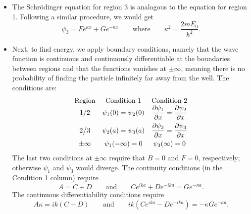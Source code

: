 \documentclass[11pt, a4paper]{article}
\newcommand{\eqtext}[1]{\qquad \text{#1} \qquad}
\newcommand{\Schro}{Schr\"{o}dinger\xspace}
\begin{document}
\begin{itemize}
	\item The \Schro equation for region 3 is analogous to the equation for region 1. Following a similar procedure, we would get
	\begin{equation*}
		\psi_{3} = Fe^{\kappa x} + Ge^{-\kappa x} \eqtext{where} \kappa^{2} = \frac{2mE_{0}}{\hbar^{2}}.
	\end{equation*}
	
	\item Next, to find energy, we apply boundary conditions, namely that the wave function is continuous and continuously differentiable at the boundaries between regions and that the functions vanishes at $ \pm \infty $, meaning there is no probability of finding the particle infinitely far away from the well. The conditions are:
	\[
		\begin{array}{ccc}
			\text{Region} & \text{Condition 1} & \text{Condition 2}\\
			1/2 & \psi_{1}(0) = \psi_{2}(0) &\displaystyle \pdv{\psi_{1}}{x} (0) = \pdv{\psi_{2}}{x} (0)\\[3mm]
			2\big/3 & \psi_{2}(a) = \psi_{3} (a) &\displaystyle \pdv{\psi_{2}}{x} (a) = \pdv{\psi_{3}}{x} (a)\\[2.5mm]
			\pm \infty & \psi_{1}(-\infty) = 0 & \psi_{3}(\infty) = 0
		\end{array}
	\]
	The last two conditions at $ \pm \infty $ require that $ B = 0 $ and $ F = 0 $, respectively; otherwise $ \psi_{1} $ and $ \psi_{3} $ would diverge. The continuity conditions (in the Condition 1 column) require
	\begin{equation*}
		A = C + D \eqtext{and} Ce^{ika} + De^{-ika} = Ge^{-\kappa a}.
	\end{equation*}
	The continuous differentiability conditions require 
	\begin{equation*}
		A\kappa = ik(C-D) \eqtext{and} ik(Ce^{ika} - De^{-ika}) = - \kappa Ge^{-\kappa a}.
	\end{equation*}
	

\end{itemize}
\end{document}
